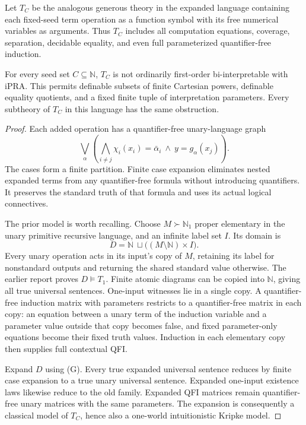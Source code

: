 Let \(T_C\) be the analogous generous theory in the expanded language
containing each fixed-seed term operation as a function symbol with
its free numerical variables as arguments. Thus \(T_C\) includes all
computation equations, coverage, separation, decidable equality, and
even full parameterized quantifier-free induction.

\begin{theorem}
For every seed set \(C\subseteq\mathbb N\), \(T_C\) is not ordinarily
first-order bi-interpretable with iPRA. This permits definable subsets
of finite Cartesian powers, definable equality quotients, and a fixed
finite tuple of interpretation parameters. Every subtheory of \(T_C\)
in this language has the same obstruction.
\end{theorem}
\begin{proof}
Each added operation has a quantifier-free unary-language graph
\[
 \bigvee_\alpha\left(
   \bigwedge_{i\ne j}\chi_i(x_i)=\bar\alpha_i
   \ \wedge\ y=g_\alpha(x_j)\right).                    \tag{G}
\]
The cases form a finite partition. Finite case expansion eliminates
nested expanded terms from any quantifier-free formula without
introducing quantifiers. It preserves the standard truth of that
formula and uses its actual logical connectives.

The prior model is worth recalling. Choose
\(M\succ\mathbb N_1\) proper elementary in the unary primitive recursive
language, and an infinite label set \(I\). Its domain is
\[
 D=\mathbb N\ \sqcup\bigl((M\setminus\mathbb N)\times I\bigr).
\]
Every unary operation acts in its input's copy of \(M\), retaining its
label for nonstandard outputs and returning the shared standard value
otherwise. The earlier report proves \(D\models T_1\). Finite atomic
diagrams can be copied into \(\mathbb N\), giving all true universal
sentences. One-input witnesses lie in a single copy. A quantifier-free
induction matrix with parameters restricts to a quantifier-free
matrix in each copy: an equation between a unary term of the induction
variable and a parameter value outside that copy becomes false,
and fixed parameter-only equations become their fixed truth values.
Induction in each elementary copy then supplies full contextual QFI.

Expand \(D\) using (G). Every true expanded universal sentence reduces
by finite case expansion to a true unary universal sentence. Expanded
one-input existence laws likewise reduce to the old family. Expanded
QFI matrices remain quantifier-free unary matrices with the same
parameters. The expansion is consequently a classical model of
\(T_C\), hence also a one-world intuitionistic Kripke model.


\end{proof}
